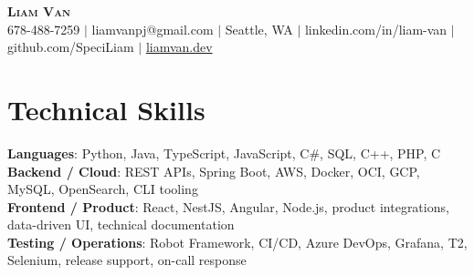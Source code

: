 \documentclass[letterpaper,11pt]{article}
\begin{document}

%
\begin{center}
    \textbf{\Huge \scshape Liam Van} \\ \vspace{1pt}
    \small 678-488-7259 $|$ \small {liamvanpj@gmail.com} $|$ Seattle, WA
 {{$|$ linkedin.com/in/liam-van} {$|$ github.com/SpeciLiam} {$|$ \href{https://liamvan.dev}{liamvan.dev}}}

\end{center}

\section{Technical Skills}
 \begin{itemize}[leftmargin=0.15in, label={}]
    \small{\item{
     \textbf{Languages}{: Python, Java, TypeScript, JavaScript, C\#, SQL, C++, PHP, C} \\
     \textbf{Backend / Cloud}{: REST APIs, Spring Boot, AWS, Docker, OCI, GCP, MySQL, OpenSearch, CLI tooling} \\
     \textbf{Frontend / Product}{: React, NestJS, Angular, Node.js, product integrations, data-driven UI, technical documentation} \\
     \textbf{Testing / Operations}{: Robot Framework, CI/CD, Azure DevOps, Grafana, T2, Selenium, release support, on-call response} \\
    }}
 \end{itemize}
%

\end{document}
